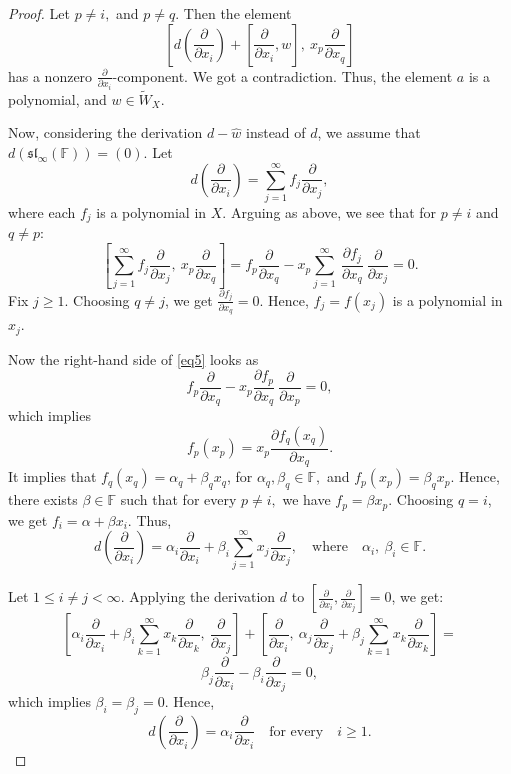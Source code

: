 \documentclass[10pt,a4paper]{amsart}
\begin{document}
\begin{proof}
		Let $p \neq i,$ and $ p \neq q.$  Then the element
		\[
		\left[  d\left( \frac{\partial}{\partial x_i} \right) + \left[ \frac{\partial}{\partial x_i}, w \right] , \ x_p \frac{\partial}{\partial x_q}\right]
		\]
		has a nonzero \( \frac{\partial}{\partial x_i} \)-component. We got a contradiction. Thus, the element $a$ is a polynomial, and $w\in \widetilde{W}_X.$  
		
		
		Now, considering the derivation $d - \hat{w}$ instead of $d$, we assume that $d(\mathfrak{sl}_\infty(\mathbb{F})) = (0).$ Let
		\[
		d\left(\frac{\partial}{\partial x_i}\right) = \sum_{j=1}^{\infty} f_j \frac{\partial}{\partial x_j}, \] where each $ f_j $ is a polynomial in $X.$ Arguing as above, we see that for $p \neq i$ and $q \neq p$:
		\begin{equation}\label{eq5}
			\left[ \sum_{j=1}^{\infty} f_j  \frac{\partial}{\partial x_j}, \ x_p \frac{\partial}{\partial x_q} \right] = 
			f_p \frac{\partial}{\partial x_q} - x_p  \sum_{j=1}^{\infty} \ \frac{\partial f_j}{\partial x_q} \ \frac{\partial}{\partial x_j} = 0 .
		\end{equation}
		Fix $j \geq 1$. Choosing $q \neq j$, we get $\frac{\partial f_j}{\partial x_q} = 0.$  Hence,
		$f_j = f(x_j)$ is a polynomial in $x_j.$
		
		Now the right-hand side of \eqref{eq5} looks as
		\[
		f_p  \frac{\partial}{\partial x_q} - x_p  \frac{\partial f_p}{\partial x_q}\  \frac{\partial}{\partial x_p} = 0,
		\]
		which implies
		\[
		f_p(x_p) = x_p  \frac{\partial f_q(x_q)}{\partial x_q}.
		\] It implies that $f_q(x_q) = \alpha_q + \beta_q x_q$, for $\alpha_q, \beta_q \in \mathbb{F},$ and $f_p(x_p) =  \beta_q x_p.$  Hence, there exists $\beta \in \mathbb{F}$ such that for every $p\not= i, $  we have 
		$f_p = \beta x_p.$ Choosing $q = i$, we get $f_i = \alpha + \beta x_i$. Thus,
		\[
		d\left( \frac{\partial}{\partial x_i} \right) = \alpha_i  \frac{\partial}{\partial x_i} + \beta_i  \sum_{j=1}^{\infty} x_j  \frac{\partial}{\partial x_j}, \quad \text{where} \quad \alpha_i, \ \beta_i \in \mathbb{F}.
		\]
		
		Let $1 \leq i \neq j < \infty$. Applying the derivation $d$ to $[\frac{\partial}{\partial x_i}, \frac{\partial}{\partial x_j}] = 0$, we get:
		\[
		\left[ \alpha_i   \frac{\partial}{\partial x_i} + \beta_i  \sum_{k=1}^{\infty}  x_k  \frac{\partial}{\partial x_k}, \ \frac{\partial}{\partial x_j} \right] + \left[ \frac{\partial}{\partial x_i}, \ \alpha_j  \frac{\partial}{\partial x_j} + \beta_j  \sum_{k=1}^{\infty}  x_k  \frac{\partial}{\partial x_k} \right] = 
		\]
		\[ \beta_j  \frac{\partial}{\partial x_i} -\beta_i \frac{\partial}{\partial x_j} = 0,
		\]
		which implies $\beta_i = \beta_j = 0$.
		Hence, $$d\left(\frac{\partial}{\partial x_i}\right) = \alpha_i   \frac{\partial}{\partial x_i} \quad \text{for every} \quad  i \geq 1.$$
		

\end{proof}
\end{document}
